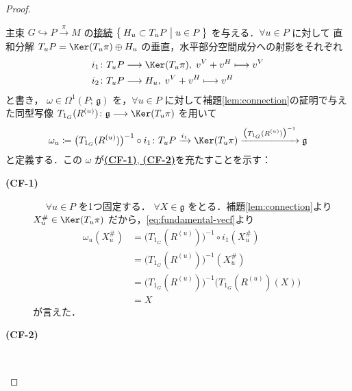 \documentclass[TQFT_main]{subfiles}
\begin{document}
\begin{proof}
\begin{enumerate}
\begin{description}
            主束 $G \hookrightarrow P \xrightarrow{\pi} M$ の\hyperref[def:connection]{接続} $\bigl\{\, H_u \subset T_u P \bigm| u \in P \,\bigr\}$ を与える．$\forall u \in P$ に対して
            直和分解 $T_u P = \Ker (T_u \pi) \oplus H_u$ の垂直，水平部分空間成分への射影をそれぞれ 
            \begin{align}
                i_1 \colon T_u P &\lto \Ker (T_u \pi),\; v^V + v^H \lmto v^V \\
                i_2 \colon T_u P &\lto H_u,\; v^V + v^H \lmto v^H
            \end{align}
            と書き，
            $\omega \in \Omega^1(P;\, \mathfrak{g})$ を，$\forall u \in P$ に対して補題\ref{lem:connection}の証明で与えた同型写像 $T_{1_G} (R^{(u)}) \colon \mathfrak{g} \lto \Ker (T_u \pi)$ を用いて
            \begin{align}
                \omega_u \coloneqq \bigl(T_{1_G} (R^{(u)})\bigr)^{-1} \circ i_1 \colon T_u P \xrightarrow{i_1} \Ker (T_u \pi) \xrightarrow{\bigl(T_{1_G} (R^{(u)})\bigr)^{-1}} \mathfrak{g}
            \end{align}
            と定義する．この $\omega$ が\hyperref[def:connection]{\textbf{\textsf{(CF-1)}}, \textbf{\textsf{(CF-2)}}}を充たすことを示す：
            \begin{description}
                \item[\textbf{(CF-1)}]　
                $\forall u \in P$ を1つ固定する．
                $\forall X \in \mathfrak{g}$ をとる．補題\ref{lem:connection}より $X_u^\# \in \Ker (T_u\pi)$ だから，\eqref{eq:fundamental-vecf}より
                \begin{align}
                    \omega_u (X^\#_u) &= \bigl(T_{1_G} (R^{(u)})\bigr)^{-1} \circ i_1(X^\#_u) \\
                    &= \bigl(T_{1_G} (R^{(u)})\bigr)^{-1} (X^\#_u) \\
                    &= \bigl(T_{1_G} (R^{(u)})\bigr)^{-1} \bigl( T_{1_G}(R^{(u)})(X) \bigr)  \\
                    &= X \label{eq:CF-1}
                \end{align}
                が言えた．
                \item[\textbf{(CF-2)}]　
                

\end{description}
\end{description}
\end{enumerate}
\end{proof}
\end{document}
